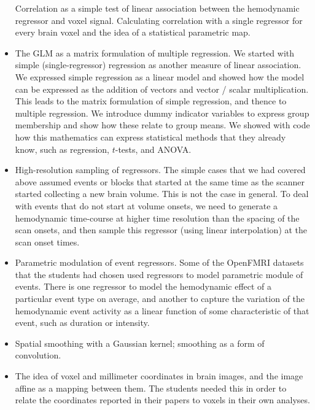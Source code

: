 \begin{itemize}
    Correlation as a simple test of linear association between the hemodynamic
        regressor and voxel signal.  Calculating correlation with a single
        regressor for every brain voxel and the idea of a statistical
        parametric map.
\item
    The GLM as a matrix formulation of multiple regression.  We started with
        simple (single-regressor) regression as another measure of linear
        association.  We expressed simple regression as a linear model and
        showed how the model can be expressed as the addition of vectors and
        vector / scalar multiplication.  This leads to the matrix formulation
        of simple regression, and thence to multiple regression.  We introduce
        dummy indicator variables to express group membership and show how
        these relate to group means.  We showed with code how this mathematics
        can express statistical methods that they already know, such as
        regression, $t$-tests, and ANOVA.
\item
    High-resolution sampling of regressors.  The simple cases that we had
        covered above assumed events or blocks that started at the same time
        as the scanner started collecting a new brain volume.  This is not the
        case in general.  To deal with events that do not start at volume
        onsets, we need to generate a hemodynamic time-course at higher
        time resolution than the spacing of the scan onsets, and then sample
        this regressor (using linear interpolation) at the scan onset times.
\item
    Parametric modulation of event regressors.  Some of the OpenFMRI datasets
        that the students had chosen used regressors to model parametric
        module of events.  There is one regressor to model the hemodynamic
        effect of a particular event type on average, and another to capture
        the variation of the hemodynamic event activity as a linear function
        of some characteristic of that event, such as duration or intensity.
\item
    Spatial smoothing with a Gaussian kernel; smoothing as a form of
    convolution.

\item
    The idea of voxel and millimeter coordinates in brain images, and the
    image affine as a mapping between them.  The students needed this in order
    to relate the coordinates reported in their papers to voxels in their own
    analyses.


\end{itemize}
